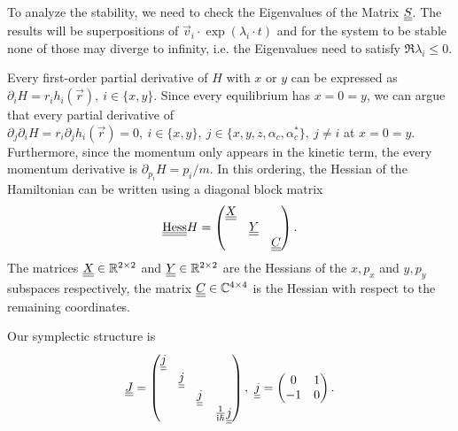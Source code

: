 To analyze the stability,
    we need to check the Eigenvalues of the Matrix $\underline{\underline{S}}$.
The results will be superpositions of $\vec v_i \cdot\exp(\lambda_i\cdot t)$
    and for the system to be stable none of those may diverge to infinity, 
    i.e. the Eigenvalues need to satisfy $\Re\lambda_i \leq 0$.

Every first-order partial derivative of $H$ with $x$ or $y$  can be expressed as $\partial_i H = r_i h_i(\vec r),~i\in \{x,y\}$.
Since every equilibrium has $x = 0 = y$,
    we can argue that every partial derivative of $\partial_j \partial_i H = r_i \partial_j h_i(\vec r) = 0,~ i\in \{x,y\}, ~j \in \{x,y,z, \alpha_c, \alpha_c^*\},~j\neq i$ at $x=0=y$.
Furthermore, since the momentum only appears in the kinetic term,
    the every momentum derivative is $\partial_{p_i} H = p_i/m$.
In this ordering, the Hessian of the Hamiltonian can be written using a diagonal block matrix
\begin{equation}
    \underline{\underline{\mathrm{Hess}}} H = \begin{pmatrix}
        \underline{\underline{X}} \\
        & \underline{\underline{Y}} \\
        & & \underline{\underline{C}}
    \end{pmatrix}.
\end{equation}
The matrices $\underline{\underline{X}} \in \mathbb{R}^{2\times 2}$ and $\underline{\underline{Y}} \in \mathbb{R}^{2\times 2}$ are the Hessians of the $x, p_x$ and $y, p_y$ subspaces respectively, 
    the matrix $\underline{\underline{C}} \in \mathbb{C}^{4\times 4}$ is the Hessian with respect to the remaining coordinates.

Our symplectic structure is
\begin{equation}
    \underline{\underline{J}} = \begin{pmatrix}
        \underline{\underline{j}} \\
        & \underline{\underline{j}}\\
        & & \underline{\underline{j}} \\
        & & & \tfrac1{\mathrm{i} \hbar}\underline{\underline{j}}
    \end{pmatrix},~\underline{\underline{j}} = \begin{pmatrix}
        0 & 1\\ -1 & 0 
    \end{pmatrix}.
\end{equation}

